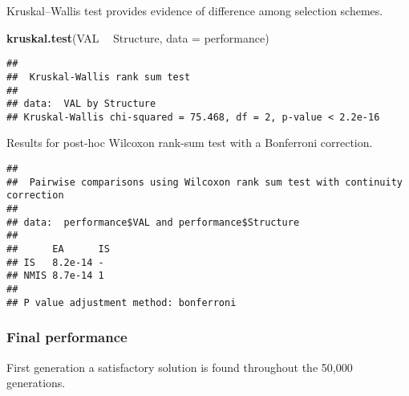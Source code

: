 \documentclass[]{book}
\newenvironment{Shaded}{\begin{snugshade}}{\end{snugshade}}
\newcommand{\DataTypeTok}[1]{\textcolor[rgb]{0.13,0.29,0.53}{#1}}
\newcommand{\KeywordTok}[1]{\textcolor[rgb]{0.13,0.29,0.53}{\textbf{#1}}}
\newcommand{\NormalTok}[1]{#1}
\newcommand{\OperatorTok}[1]{\textcolor[rgb]{0.81,0.36,0.00}{\textbf{#1}}}
\newcommand{\OtherTok}[1]{\textcolor[rgb]{0.56,0.35,0.01}{#1}}
\newcommand{\StringTok}[1]{\textcolor[rgb]{0.31,0.60,0.02}{#1}}
\begin{document}
Kruskal--Wallis test provides evidence of difference among selection schemes.

\begin{Shaded}
\begin{Highlighting}[]
\KeywordTok{kruskal.test}\NormalTok{(VAL }\OperatorTok{~}\StringTok{ }\NormalTok{Structure, }\DataTypeTok{data =}\NormalTok{ performance)}
\end{Highlighting}
\end{Shaded}

\begin{verbatim}
## 
##  Kruskal-Wallis rank sum test
## 
## data:  VAL by Structure
## Kruskal-Wallis chi-squared = 75.468, df = 2, p-value < 2.2e-16
\end{verbatim}

Results for post-hoc Wilcoxon rank-sum test with a Bonferroni correction.

\begin{Shaded}
\end{Shaded}

\begin{verbatim}
## 
##  Pairwise comparisons using Wilcoxon rank sum test with continuity correction 
## 
## data:  performance$VAL and performance$Structure 
## 
##      EA      IS
## IS   8.2e-14 - 
## NMIS 8.7e-14 1 
## 
## P value adjustment method: bonferroni
\end{verbatim}

\hypertarget{final-performance-9}{%
\subsubsection{Final performance}\label{final-performance-9}}

First generation a satisfactory solution is found throughout the 50,000 generations.
\end{document}
